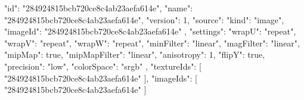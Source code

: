 {
  "id": "284924815bcb720ce8c4ab23aefa614e",
  "name": "284924815bcb720ce8c4ab23aefa614e",
  "version": 1,
  "source": {
    "kind": "image",
    "imageId": "284924815bcb720ce8c4ab23aefa614e"
  },
  "settings": {
    "wrapU": "repeat",
    "wrapV": "repeat",
    "wrapW": "repeat",
    "minFilter": "linear",
    "magFilter": "linear",
    "mipMap": true,
    "mipMapFilter": "linear",
    "anisotropy": 1,
    "flipY": true,
    "precision": "low",
    "colorSpace": "srgb"
  },
  "textureIds": [
    "284924815bcb720ce8c4ab23aefa614e"
  ],
  "imageIds": [
    "284924815bcb720ce8c4ab23aefa614e"
  ]
}
